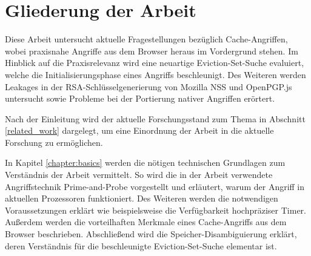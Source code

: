 


\section{Gliederung der Arbeit}

Diese Arbeit untersucht aktuelle Fragestellungen bezüglich Cache-Angriffen, wobei praxisnahe Angriffe aus dem Browser heraus im Vordergrund stehen.
Im Hinblick auf die Praxisrelevanz wird eine neuartige Eviction-Set-Suche evaluiert, welche die Initialisierungsphase eines Angriffs beschleunigt.
Des Weiteren werden Leakages in der RSA-Schlüsselgenerierung von Mozilla NSS und OpenPGP.js untersucht sowie Probleme bei der Portierung nativer Angriffen erörtert.

\par \medskip                         

Nach der Einleitung wird der aktuelle Forschungsstand zum Thema in Abschnitt \ref{related_work} dargelegt, um eine Einordnung der Arbeit in die aktuelle Forschung zu ermöglichen.

\par \medskip                     

In Kapitel \ref{chapter:basics} werden die nötigen technischen Grundlagen zum Verständnis der Arbeit vermittelt.
So wird die in der Arbeit verwendete Angriffstechnik Prime-and-Probe vorgestellt und erläutert, warum der Angriff in aktuellen Prozessoren funktioniert.
Des Weiteren werden die notwendigen Voraussetzungen erklärt wie beispielsweise die Verfügbarkeit hochpräziser Timer.
Außerdem werden die vorteilhaften Merkmale eines Cache-Angriffs aus dem Browser beschrieben.
Abschließend wird die Speicher-Disambiguierung erklärt, deren Verständnis für die beschleunigte Eviction-Set-Suche elementar ist.

